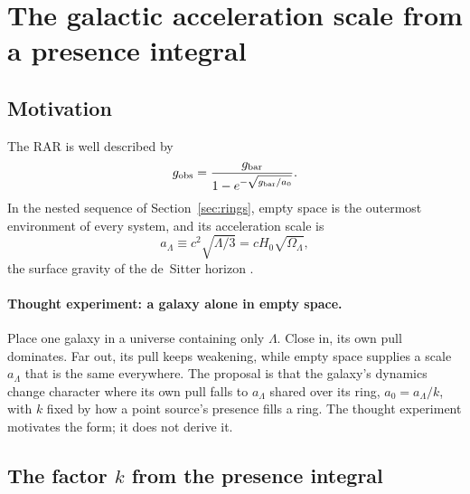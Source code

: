 \documentclass[11pt]{article}
\newcommand{\aL}{a_\Lambda}
\begin{document}
\section{The galactic acceleration scale from a presence integral}
\label{sec:a0}

\subsection{Motivation}

The RAR is well described by \citep{McGaugh2016}
\begin{equation}
g_{\rm obs}=\frac{g_{\rm bar}}{1-e^{-\sqrt{g_{\rm bar}/a_0}}}.
\label{eq:rar}
\end{equation}
In the nested sequence of Section~\ref{sec:rings}, empty space is the outermost environment of every system, and its acceleration scale is
\begin{equation}
\aL\equiv c^2\sqrt{\Lambda/3}=cH_0\sqrt{\Omega_\Lambda},
\end{equation}
the surface gravity of the de~Sitter horizon \citep{GibbonsHawking1977}.

\paragraph{Thought experiment: a galaxy alone in empty space.} Place one galaxy in a universe containing only $\Lambda$. Close in, its own pull dominates. Far out, its pull keeps weakening, while empty space supplies a scale $\aL$ that is the same everywhere. The proposal is that the galaxy's dynamics change character where its own pull falls to $\aL$ shared over its ring, $a_0=\aL/k$, with $k$ fixed by how a point source's presence fills a ring. The thought experiment motivates the form; it does not derive it.

\subsection{The factor $k$ from the presence integral}
\end{document}
